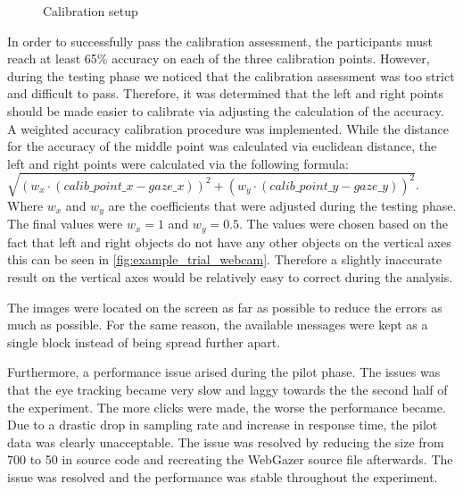 \begin{figure}
    \centering
    \caption{Calibration setup}
    \label{fig:calibration_webcam}
\end{figure}

In order to successfully pass the calibration assessment, the participants must reach at least 65\% accuracy on each of the three calibration points. However, during the testing phase we noticed that the calibration assessment was too strict and difficult to pass. Therefore, it was determined that the left and right points should be made easier to calibrate via adjusting the calculation of the accuracy. A weighted accuracy calibration procedure was implemented. While the distance for the accuracy of the middle point was calculated via euclidean distance, the left and right points were calculated via the following formula: $\sqrt{(w_x\cdot(calib\_point\_x - gaze\_x))^2 + (w_y\cdot(calib\_point\_y - gaze\_y))^2}$. Where $w_x$ and $w_y$ are the coefficients that were adjusted during the testing phase. The final values were $w_x = 1$ and $w_y = 0.5$. The values were chosen based on the fact that left and right objects do not have any other objects on the vertical axes this can be seen in \autoref{fig:example_trial_webcam}. Therefore a slightly inaccurate result on the vertical axes would be relatively easy to correct during the analysis.

The images were located on the screen as far as possible to reduce the errors as much as possible. For the same reason, the available messages were kept as a single block instead of being spread further apart. 

Furthermore, a performance issue arised during the pilot phase. The issues was that the eye tracking became very slow and laggy towards the the second half of the experiment. The more clicks were made, the worse the performance became. Due to a drastic drop in sampling rate and increase in response time, the pilot data was clearly unacceptable. The issue was resolved by reducing the  size from 700 to 50 in source code and recreating the WebGazer source file afterwards. The issue was resolved and the performance was stable throughout the experiment. 

